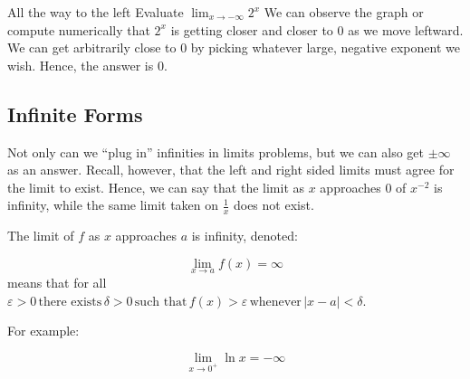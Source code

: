 \begin{example}{All the way to the left}
	\exProblem
Evaluate $\displaystyle \lim_{x \to -\infty}2^x$
	\exSolution
We can observe the graph or compute numerically that $2^x$ is getting closer
and closer to 0 as we move leftward.  We can get arbitrarily close to 0 by picking
whatever large, negative exponent we wish.  Hence, the answer is 0.
\end{example}




\subsection{Infinite Forms}
Not only can we ``plug in'' infinities in limits problems, but we can also get
$\pm\infty$ as an answer.  Recall, however, that the left and right sided limits
must agree for the limit to exist.  Hence, we can say that the limit as $x$ 
approaches 0 of $x^{-2}$ is infinity, while the same limit taken on $\frac{1}{x}$
does not exist.


The limit of $f$ as $x$ approaches $a$ is infinity, denoted:

$$\lim_{x \to a} f(x) = \infty$$
means that for all $\varepsilon >0 \, \text{there exists} \, \delta >0 \, \text{such that} \, f(x) > \varepsilon \, \text{whenever}  \, |x - a| < \delta$.

For example:

$$ \lim_{x \to 0^+} \ln x = -\infty$$
